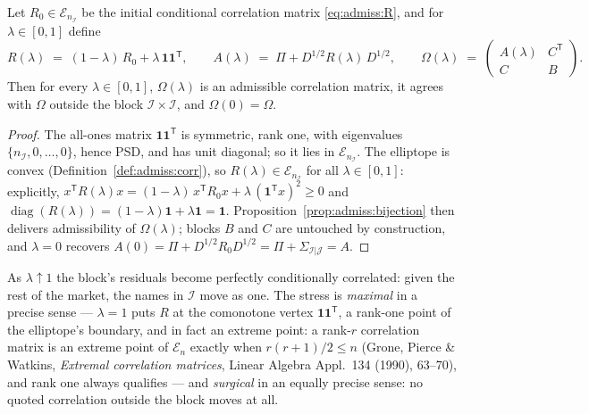 \begin{theorem}\label{thm:admiss:blend}
Let $R_0 \in \mathcal{E}_{n_{\mathcal I}}$ be the initial conditional
correlation matrix \eqref{eq:admiss:R}, and for $\lambda \in [0, 1]$ define
\begin{equation}\label{eq:admiss:blend}
  R(\lambda) \;=\; (1 - \lambda)\, R_0 + \lambda\, \mathbf{1}\mathbf{1}^{\mathsf T},
  \qquad
  A(\lambda) \;=\; \Pi + D^{1/2} R(\lambda)\, D^{1/2},
  \qquad
  \Omega(\lambda) \;=\;
  \begin{pmatrix} A(\lambda) & C^{\mathsf T} \\ C & B \end{pmatrix}.
\end{equation}
Then for every $\lambda \in [0, 1]$, $\Omega(\lambda)$ is an admissible
correlation matrix, it agrees with $\Omega$ outside the block
$\mathcal I \times \mathcal I$, and $\Omega(0) = \Omega$.
\end{theorem}

\begin{proof}
The all-ones matrix $\mathbf{1}\mathbf{1}^{\mathsf T}$ is symmetric, rank
one, with eigenvalues $\{n_{\mathcal I}, 0, \dots, 0\}$, hence PSD, and has
unit diagonal; so it lies in $\mathcal{E}_{n_{\mathcal I}}$. The elliptope
is convex (Definition~\ref{def:admiss:corr}), so
$R(\lambda) \in \mathcal{E}_{n_{\mathcal I}}$ for all $\lambda \in [0,1]$:
explicitly, $x^{\mathsf T} R(\lambda) x = (1-\lambda)\, x^{\mathsf T} R_0 x
+ \lambda\, (\mathbf{1}^{\mathsf T} x)^2 \ge 0$ and
$\operatorname{diag}(R(\lambda)) = (1-\lambda)\mathbf{1} +
\lambda\mathbf{1} = \mathbf{1}$. Proposition~\ref{prop:admiss:bijection}
then delivers admissibility of $\Omega(\lambda)$; blocks $B$ and $C$ are
untouched by construction, and $\lambda = 0$ recovers
$A(0) = \Pi + D^{1/2} R_0 D^{1/2} = \Pi + \Sigma_{\mathcal I|\mathcal J} =
A$.
\end{proof}

As $\lambda \uparrow 1$ the block's residuals become perfectly
conditionally correlated: given the rest of the market, the names in
$\mathcal I$ move as one. The stress is \emph{maximal} in a precise sense
--- $\lambda = 1$ puts $R$ at the comonotone vertex
$\mathbf{1}\mathbf{1}^{\mathsf T}$, a rank-one point of the elliptope's
boundary, and in fact an extreme point: a rank-$r$ correlation matrix is
an extreme point of $\mathcal{E}_n$ exactly when $r(r+1)/2 \le n$ (Grone,
Pierce \& Watkins, \emph{Extremal correlation matrices}, Linear Algebra
Appl.\ 134 (1990), 63--70), and rank one always qualifies --- and
\emph{surgical} in an equally precise sense: no quoted correlation outside
the block moves at all.


